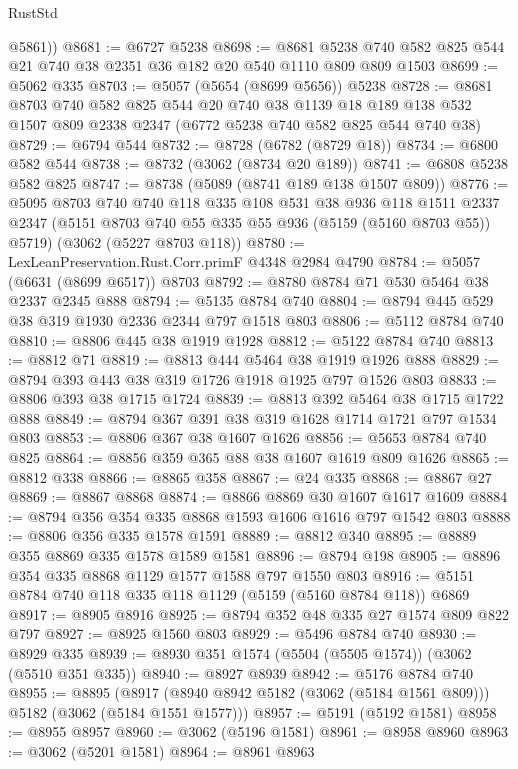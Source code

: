 \begin{lexlean}{RustStd}
\begin{coremodule}
        @5861))
@8681 := @6727 @5238
@8698 := @8681 @5238 @740 @582 @825 @544 @21 @740 @38 @2351 @36 @182 @20 @540 @1110 @809 @809 @1503
@8699 := @5062 @335
@8703 := @5057 (@5654 (@8699 @5656)) @5238
@8728 := @8681
    @8703
    @740
    @582
    @825
    @544
    @20
    @740
    @38
    @1139
    @18
    @189
    @138
    @532
    @1507
    @809
    @2338
    @2347
    (@6772 @5238 @740 @582 @825 @544 @740 @38)
@8729 := @6794 @544
@8732 := @8728 (@6782 (@8729 @18))
@8734 := @6800 @582 @544
@8738 := @8732 (@3062 (@8734 @20 @189))
@8741 := @6808 @5238 @582 @825
@8747 := @8738 (@5089 (@8741 @189 @138 @1507 @809))
@8776 := @5095
    @8703
    @740
    @740
    @118
    @335
    @108
    @531
    @38
    @936
    @118
    @1511
    @2337
    @2347
    (@5151 @8703 @740 @55 @335 @55 @936 (@5159 (@5160 @8703 @55)) @5719)
    (@3062 (@5227 @8703 @118))
@8780 := LexLeanPreservation.Rust.Corr.primF @4348 @2984 @4790
@8784 := @5057 (@6631 (@8699 @6517)) @8703
@8792 := @8780 @8784 @71 @530 @5464 @38 @2337 @2345 @888
@8794 := @5135 @8784 @740
@8804 := @8794 @445 @529 @38 @319 @1930 @2336 @2344 @797 @1518 @803
@8806 := @5112 @8784 @740
@8810 := @8806 @445 @38 @1919 @1928
@8812 := @5122 @8784 @740
@8813 := @8812 @71
@8819 := @8813 @444 @5464 @38 @1919 @1926 @888
@8829 := @8794 @393 @443 @38 @319 @1726 @1918 @1925 @797 @1526 @803
@8833 := @8806 @393 @38 @1715 @1724
@8839 := @8813 @392 @5464 @38 @1715 @1722 @888
@8849 := @8794 @367 @391 @38 @319 @1628 @1714 @1721 @797 @1534 @803
@8853 := @8806 @367 @38 @1607 @1626
@8856 := @5653 @8784 @740 @825
@8864 := @8856 @359 @365 @88 @38 @1607 @1619 @809 @1626
@8865 := @8812 @338
@8866 := @8865 @358
@8867 := @24 @335
@8868 := @8867 @27
@8869 := @8867 @8868
@8874 := @8866 @8869 @30 @1607 @1617 @1609
@8884 := @8794 @356 @354 @335 @8868 @1593 @1606 @1616 @797 @1542 @803
@8888 := @8806 @356 @335 @1578 @1591
@8889 := @8812 @340
@8895 := @8889 @355 @8869 @335 @1578 @1589 @1581
@8896 := @8794 @198
@8905 := @8896 @354 @335 @8868 @1129 @1577 @1588 @797 @1550 @803
@8916 := @5151 @8784 @740 @118 @335 @118 @1129 (@5159 (@5160 @8784 @118)) @6869
@8917 := @8905 @8916
@8925 := @8794 @352 @48 @335 @27 @1574 @809 @822 @797
@8927 := @8925 @1560 @803
@8929 := @5496 @8784 @740
@8930 := @8929 @335
@8939 := @8930 @351 @1574 (@5504 (@5505 @1574)) (@3062 (@5510 @351 @335))
@8940 := @8927 @8939
@8942 := @5176 @8784 @740
@8955 := @8895
    (@8917 (@8940 @8942 @5182 (@3062 (@5184 @1561 @809))) @5182 (@3062 (@5184 @1551 @1577)))
@8957 := @5191 (@5192 @1581)
@8958 := @8955 @8957
@8960 := @3062 (@5196 @1581)
@8961 := @8958 @8960
@8963 := @3062 (@5201 @1581)
@8964 := @8961 @8963

\end{coremodule}
\end{lexlean}
